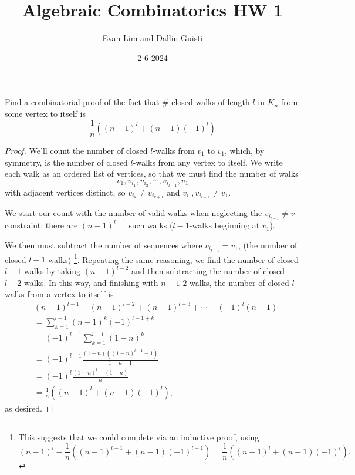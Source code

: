 \documentclass[11pt]{scrartcl}
\title{Algebraic Combinatorics HW 1}
\author{Evan Lim and Dallin Guisti}
\date{2-6-2024}
\begin{document}
\maketitle
\setcounter{section}{1}
\begin{problem}[\textcolor{red}{Closed Walks in $K_n$}]
    Find a combinatorial proof of the fact that $\#$ closed walks of length $l$ in $K_n$ from some vertex to itself is \[\frac{1}{n}\left((n-1)^l+(n-1)(-1)^l\right)\]
\end{problem}
\begin{proof}
    We'll count the number of closed $l$-walks from $v_1$ to $v_1$, which, by symmetry, is the number of closed $l$-walks from any vertex to itself. We write each walk as an ordered list of vertices, so that we must find the number of walks 
    \[v_1,v_{i_1},v_{i_2},\cdots,v_{i_{l-1}},v_1\] with adjacent vertices distinct, so $v_{i_k}\neq v_{i_{k+1}}$ and $v_{i_1},v_{i_{l-1}}\neq v_1$. 
    
    We start our count with the number of valid walks when neglecting the $v_{i_{l-1}}\neq v_1$ constraint: there are $(n-1)^{l-1}$ such walks ($l-1$-walks beginning at $v_1$). 
    
    We then must subtract the number of sequences where $v_{i_{l-1}}=v_1$, (the number of closed $l-1$-walks)
    \footnote{This suggests that we could complete via an inductive proof, using \[(n-1)^{l}-\frac{1}{n}\left((n-1)^{l-1}+(n-1)(-1)^{l-1}\right)=\frac{1}{n}\left((n-1)^{l}+(n-1)(-1)^l\right).\]}. 
    Repeating the same reasoning, we find the number of closed $l-1$-walks by taking $(n-1)^{l-2}$ and then subtracting the number of closed $l-2$-walks. In this way, and finishing with $n-1$ $2$-walks, the number of closed $l$-walks from a vertex to itself is
    \begin{align*}
        &(n-1)^{l-1}-(n-1)^{l-2}+(n-1)^{l-3}+\cdots+(-1)^l(n-1)\\
        &=\sum_{k=1}^{l-1}(n-1)^k(-1)^{l-1+k}\\
        &=(-1)^{l-1}\sum_{k=1}^{l-1}(1-n)^k\\
        &=(-1)^{l-1}\frac{(1-n)\left((1-n)^{l-1}-1\right)}{1-n-1}\\
        &=(-1)^{l}\frac{(1-n)^{l}-(1-n)}{n}\\
        &=\frac{1}{n}\left((n-1)^l+(n-1)(-1)^l\right),
    \end{align*}
    as desired.
\end{proof}
\end{document}
